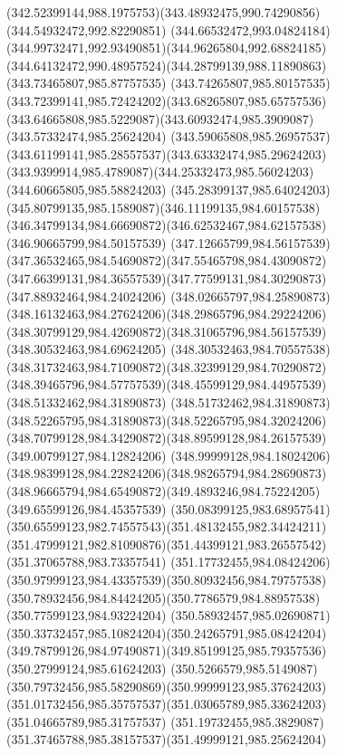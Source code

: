 {    \curveto(342.52399144,988.1975753)(343.48932475,990.74290856)(344.54932472,992.82290851)
    \curveto(344.66532472,993.04824184)(344.99732471,992.93490851)(344.96265804,992.68824185)
    \curveto(344.64132472,990.48957524)(344.28799139,988.11890863)(343.73465807,985.87757535)
    \curveto(343.74265807,985.80157535)(343.72399141,985.72424202)(343.68265807,985.65757536)
    \curveto(343.64665808,985.5229087)(343.60932474,985.3909087)(343.57332474,985.25624204)
    \curveto(343.59065808,985.26957537)(343.61199141,985.28557537)(343.63332474,985.29624203)
    \curveto(343.9399914,985.4789087)(344.25332473,985.56024203)(344.60665805,985.58824203)
    \curveto(345.28399137,985.64024203)(345.80799135,985.1589087)(346.11199135,984.60157538)
    \curveto(346.34799134,984.66690872)(346.62532467,984.62157538)(346.90665799,984.50157539)
    \curveto(347.12665799,984.56157539)(347.36532465,984.54690872)(347.55465798,984.43090872)
    \curveto(347.66399131,984.36557539)(347.77599131,984.30290873)(347.88932464,984.24024206)
    \curveto(348.02665797,984.25890873)(348.16132463,984.27624206)(348.29865796,984.29224206)
    \curveto(348.30799129,984.42690872)(348.31065796,984.56157539)(348.30532463,984.69624205)
    \curveto(348.30532463,984.70557538)(348.31732463,984.71090872)(348.32399129,984.70290872)
    \curveto(348.39465796,984.57757539)(348.45599129,984.44957539)(348.51332462,984.31890873)
    \curveto(348.51732462,984.31890873)(348.52265795,984.31890873)(348.52265795,984.32024206)
    \curveto(348.70799128,984.34290872)(348.89599128,984.26157539)(349.00799127,984.12824206)
    \curveto(348.99999128,984.18024206)(348.98399128,984.22824206)(348.98265794,984.28690873)
    \curveto(348.96665794,984.65490872)(349.4893246,984.75224205)(349.65599126,984.45357539)
    \curveto(350.08399125,983.68957541)(350.65599123,982.74557543)(351.48132455,982.34424211)
    \curveto(351.47999121,982.81090876)(351.44399121,983.26557542)(351.37065788,983.73357541)
    \curveto(351.17732455,984.08424206)(350.97999123,984.43357539)(350.80932456,984.79757538)
    \curveto(350.78932456,984.84424205)(350.7786579,984.88957538)(350.77599123,984.93224204)
    \curveto(350.58932457,985.02690871)(350.33732457,985.10824204)(350.24265791,985.08424204)
    \curveto(349.78799126,984.97490871)(349.85199125,985.79357536)(350.27999124,985.61624203)
    \curveto(350.5266579,985.5149087)(350.79732456,985.58290869)(350.99999123,985.37624203)
    \curveto(351.01732456,985.35757537)(351.03065789,985.33624203)(351.04665789,985.31757537)
    \curveto(351.19732455,985.3829087)(351.37465788,985.38157537)(351.49999121,985.25624204)
}
